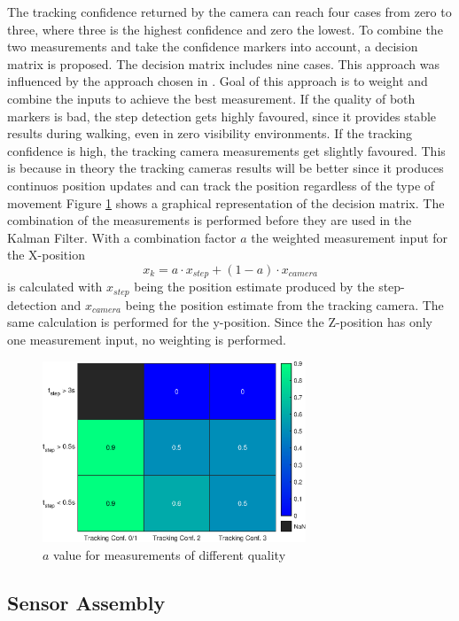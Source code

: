 \documentclass[engproc,conferenceproceedings,submit,pdftex,moreauthors]{Definitions/mdpi}
\begin{document}
The tracking confidence returned by the camera can reach four cases from zero to three, where three is the highest confidence and zero the lowest.
To combine the two measurements and take the confidence markers into account, a decision matrix is proposed. The decision matrix includes nine cases. This approach was influenced by the approach chosen in \cite{caron2006}. Goal of this approach is to weight and combine the inputs to achieve the best measurement.  If the quality of both markers is bad, the step detection gets highly favoured, since it provides stable results during walking, even in zero visibility environments. If the tracking confidence is high, the tracking camera measurements get slightly favoured. This is because in theory the tracking cameras results will be better since it produces continuos position updates and can track the position regardless of the type of movement Figure \ref{fig:confidence} shows a graphical representation of the decision matrix. The combination of the measurements is performed before they are used in the Kalman Filter. With a combination factor  $a$ the weighted measurement input for the X-position
\begin{equation}
	x_{k} = a\cdot x_{step} + (1-a)\cdot x_{camera}
\end{equation}  
is calculated with $x_{step}$ being the position estimate produced by the step-detection and $x_{camera}$ being the position estimate from the tracking camera. The same calculation is performed for the y-position. Since the Z-position has only one measurement input, no weighting is performed.
\begin{figure}[h!]
	\centering
	\includegraphics[width=0.7\textwidth]{measurementQuality.eps}
	\caption{$a$ value for measurements of different quality}
	\label{fig:confidence}
	
\end{figure}

\subsection{Sensor Assembly}
 
\end{document}
